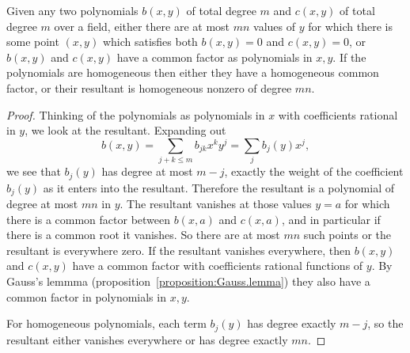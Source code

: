 \begin{proposition}\label{proposition:resultant.degree}
Given any two polynomials \(b(x,y)\) of total degree \(m\) and \(c(x,y)\) of total degree \(m\) over a field, either there are at most \(mn\) values of \(y\) for which there is some point \((x,y)\) which satisfies both \(b(x,y)=0\) and \(c(x,y)=0\), or \(b(x,y)\) and \(c(x,y)\) have a common factor as polynomials in \(x,y\).
If the polynomials are homogeneous then either they have a homogeneous common factor, or their resultant is homogeneous nonzero of degree \(mn\).
\end{proposition}
\begin{proof}
Thinking of the polynomials as polynomials in \(x\) with coefficients rational in \(y\), we look at the resultant.
Expanding out 
\[
b(x,y)=\sum_{j+k \le m} b_{jk} x^k y^j=\sum_j b_j(y) x^j,
\]
we see that \(b_j(y)\) has degree at most \(m-j\), exactly the weight of the coefficient \(b_j(y)\) as it enters into the resultant.
Therefore the resultant is a polynomial of degree at most \(mn\) in \(y\).
The resultant vanishes at those values \(y=a\) for which there is a common factor between \(b(x,a)\) and \(c(x,a)\), and in particular if there is a common root it vanishes.
So there are at most \(mn\) such points or the resultant is everywhere zero.
If the resultant vanishes everywhere, then \(b(x,y)\) and \(c(x,y)\) have a common factor with coefficients rational functions of \(y\).
By Gauss's lemmma (proposition~\vref{proposition:Gauss.lemma}) they also have a common factor in polynomials in \(x,y\). 

For homogeneous polynomials, each term \(b_j(y)\) has degree exactly \(m-j\), so the resultant either vanishes everywhere or has degree exactly \(mn\).
\end{proof}
